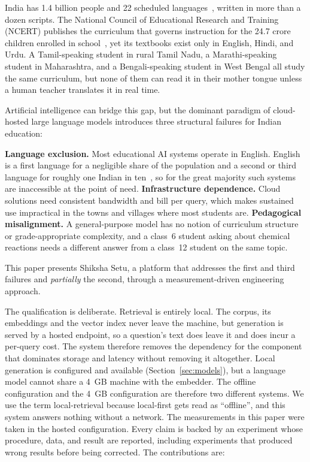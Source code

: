 India has 1.4 billion people and 22 scheduled languages~\cite{b24}, written in more than a dozen scripts. The National Council of Educational Research and Training (NCERT) publishes the curriculum that governs instruction for the 24.7 crore children enrolled in school~\cite{b30}, yet its textbooks exist only in English, Hindi, and Urdu. A Tamil-speaking student in rural Tamil Nadu, a Marathi-speaking student in Maharashtra, and a Bengali-speaking student in West Bengal all study the same curriculum, but none of them can read it in their mother tongue unless a human teacher translates it in real time.

Artificial intelligence can bridge this gap, but the dominant paradigm of cloud-hosted large language models introduces three structural failures for Indian education:

\textbf{Language exclusion.} Most educational AI systems operate in English. English is a first language for a negligible share of the population and a second or third language for roughly one Indian in ten~\cite{b24}, so for the great majority such systems are inaccessible at the point of need. \textbf{Infrastructure dependence.} Cloud solutions need consistent bandwidth and bill per query, which makes sustained use impractical in the towns and villages where most students are. \textbf{Pedagogical misalignment.} A general-purpose model has no notion of curriculum structure or grade-appropriate complexity, and a class~6 student asking about chemical reactions needs a different answer from a class~12 student on the same topic.

This paper presents Shiksha Setu, a platform that addresses the first and third failures and \emph{partially} the second, through a measurement-driven engineering approach.

The qualification is deliberate. Retrieval is entirely local. The corpus, its embeddings and the vector index never leave the machine, but generation is served by a hosted endpoint, so a question's text does leave it and does incur a per-query cost. The system therefore removes the dependency for the component that dominates storage and latency without removing it altogether. Local generation is configured and available (Section~\ref{sec:models}), but a language model cannot share a 4~GB machine with the embedder. The offline configuration and the 4~GB configuration are therefore two different systems. We use the term local-retrieval because local-first gets read as ``offline'', and this system answers nothing without a network. The measurements in this paper were taken in the hosted configuration. Every claim is backed by an experiment whose procedure, data, and result are reported, including experiments that produced wrong results before being corrected. The contributions are:

